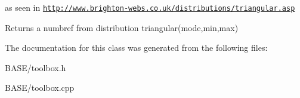 as seen in \href{http://www.brighton-webs.co.uk/distributions/triangular.asp}{\tt http\+://www.\+brighton-\/webs.\+co.\+uk/distributions/triangular.\+asp} 

\begin{DoxyReturn}{Returns}
a numbref from distribution triangular(mode,min,max) 
\end{DoxyReturn}


The documentation for this class was generated from the following files\+:\begin{DoxyCompactItemize}
\item 
B\+A\+S\+E/toolbox.\+h\item 
B\+A\+S\+E/toolbox.\+cpp\end{DoxyCompactItemize}
